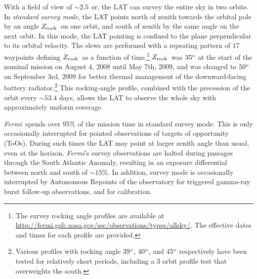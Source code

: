 \documentclass[aps,twocolumn,prd,superscriptaddress,showpacs,nofootinbib,fixfloat]{revtex4}
\newcommand{\Fermi}{{\slshape Fermi}}
\newcommand{\degree}{^{\rm o}}
\newcommand{\zrock}{$Z_{\rm rock}$}
\begin{document}



With a field of view of $\sim2.5$~sr, the LAT can survey the
entire sky in two orbits.  In \emph{standard survey mode},
the LAT points north of zenith towards the orbital pole by
an angle \zrock\ on one orbit, and south of zenith by the
same angle on the next orbit.  In this mode, the LAT
pointing is confined to the plane perpendicular to its
orbital velocity.  The slews are performed with a repeating
pattern of 17 waypoints defining \zrock\ as a function of
time.\footnote{The survey rocking angle profiles are
available at
\url{http://fermi.gsfc.nasa.gov/ssc/observations/types/allsky/}.
The effective dates and times for each profile are provided.
} \zrock\ was $35\degree$ at the start of the nominal
mission on August 4, 2008 until May 7th, 2009, and was
changed to $50\degree$ on September 3rd, 2009 for better
thermal management of the downward-facing battery
radiator.\footnote{Various profiles with rocking angle
39$\degree$, 40$\degree$, and 45$\degree$ respectively have
been tested for relatively short periods, including a 3
orbit profile test that overweights the south.}  This
rocking-angle profile, combined with the precession of the
orbit every $\sim53.4$ days, allows the LAT to observe the
whole sky with approximately uniform coverage.

\Fermi\ spends over 95\% of the mission time in standard survey mode.
This is only occasionally interrupted for
pointed observations of targets of opportunity (ToOs).  During such times
the LAT may point at larger zenith angle than usual, even at the horizon.
\Fermi's survey observations are
halted during passages through the South
Atlantic Anomaly, resulting in an exposure
differential between north and south of $\sim15$\%. In addition,
survey mode is occasionally interrupted by Autonomous
Repoints of the observatory for triggered
gamma-ray burst follow-up observations, and for calibration.
\medskip
\end{document}
